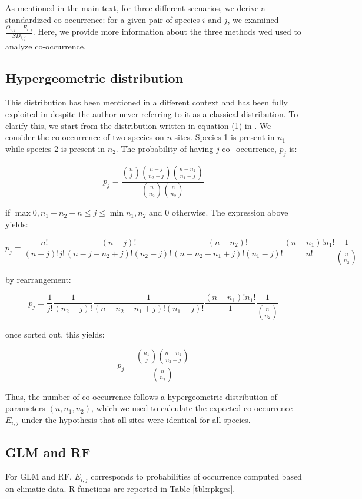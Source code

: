 As mentioned in the main text, for three different scenarios, we derive
a standardized co-occurrence: for a given pair of species \(i\) and
\(j\), we examined \(\frac{O_{i,j}-E_{i,j}}{SD_{i,j}}\). Here, we
provide more information about the three methods wed used to analyze
co-occurrence.

\subsection{Hypergeometric
distribution}\label{hypergeometric-distribution}

This distribution has been mentioned in a different context
\citep[see][]{Gilpin1982} and has been fully exploited in
\citet{Veech2013} despite the author never referring to it as a
classical distribution. To clarify this, we start from the distribution
written in equation (1) in \citet{Veech2013}. We consider the
co-occurrence of two species on \(n\) sites. Species 1 is present in
\(n_1\) while species 2 is present in \(n_2\). The probability of having
\(j\) co\_occurrence, \(p_j\) is:

\[ p_j= \frac{\binom{n}{j} \binom{n-j}{n_2-j} \binom{n-n_2}{n_1-j}}{\binom{n}{n_2} \binom{n}{n_2}} \]

if \(\max{0, n_1+n_2-n} \leq j \leq \min{n_1, n_2}\) and 0 otherwise.
The expression above yields:

\[ p_j= \frac{n!}{(n-j)!j!} \frac{(n-j)!}{(n-j-n_2+j)!(n_2-j)!} \frac{(n-n_2)!}{(n-n_2-n_1+j)!(n_1-j)!} \frac{(n-n_1)!n_1!}{n!} \frac{1}{\binom{n}{n_2}} \]

by rearrangement:

\[ p_j= \frac{1}{j!} \frac{1}{(n_2-j)!} \frac{1}{(n-n_2-n_1+j)!(n_1-j)!} \frac{(n-n_1)!n_1!}{1} \frac{1}{\binom{n}{n_2}} \]

once sorted out, this yields:

\[ p_j= \frac{\binom{n_1}{j} \binom{n-n_1}{n_2-j}}{\binom{n}{n_2}} \]

Thus, the number of co-occurrence follows a hypergeometric distribution
of parameters \((n,n_1,n_2)\), which we used to calculate the expected
co-occurrence \(E_{i,j}\) under the hypothesis that all sites were
identical for all species.

\subsection{GLM and RF}\label{glm-and-rf}

For GLM and RF, \(E_{i,j}\) corresponds to probabilities of occurrence
computed based on climatic data. R functions are reported in Table
\ref{tbl:rpkges}.

